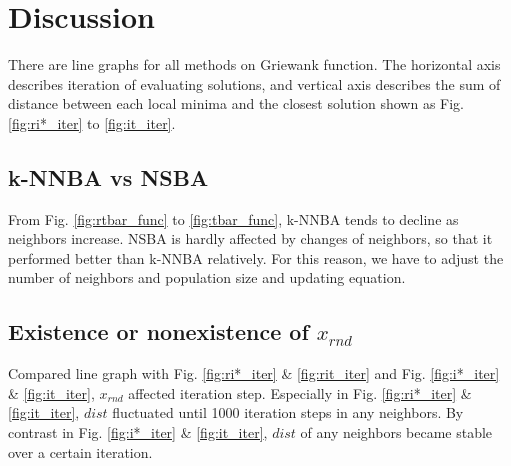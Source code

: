 

\section{Discussion}
There are line graphs for all methods on Griewank function. The horizontal axis describes iteration of evaluating solutions, and vertical axis describes the sum of distance between each local minima and the closest solution shown as Fig. \ref{fig:ri*_iter} to \ref{fig:it_iter}.
\subsection{k-NNBA vs NSBA}
From Fig. \ref{fig:rtbar_func} to \ref{fig:tbar_func}, k-NNBA tends to decline as neighbors increase. NSBA is hardly affected by changes of neighbors, so that it performed better than k-NNBA relatively. 
 For this reason, we have to adjust the number of neighbors and population size and updating equation.
  
\subsection{Existence or nonexistence of ${x_{rnd}}$}
Compared line graph with Fig. \ref{fig:ri*_iter} \& \ref{fig:rit_iter} and Fig. \ref{fig:i*_iter} \& \ref{fig:it_iter}, ${x_{rnd}}$ affected iteration step. Especially in Fig. \ref{fig:ri*_iter} \& \ref{fig:it_iter}, ${dist}$ fluctuated until 1000 iteration steps in any neighbors. By contrast in Fig. \ref{fig:i*_iter} \& \ref{fig:it_iter}, ${dist}$ of any neighbors became stable over a certain iteration. 

